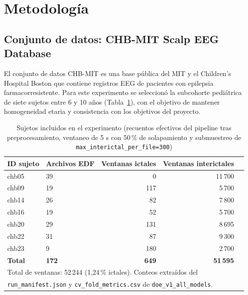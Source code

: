 \documentclass[12pt,a4paper]{article}
\begin{document}
\section{Metodología}

\subsection{Conjunto de datos: CHB-MIT Scalp EEG Database}

El conjunto de datos CHB-MIT \cite{chbmit} es una base pública del MIT y el Children's
Hospital Boston que contiene registros EEG de pacientes con epilepsia farmacorresistente.
Para este experimento se seleccionó la subcohorte pediátrica de siete sujetos entre 6 y 10
años (Tabla~\ref{tab:sujetos}), con el objetivo de mantener homogeneidad etaria y
consistencia con los objetivos del proyecto.

\begin{table}[H]
\centering
\caption{Sujetos incluidos en el experimento (recuentos efectivos del pipeline tras
preprocesamiento, ventaneo de 5 s con 50\,\% de solapamiento y submuestreo de
\texttt{max\_interictal\_per\_file=300})}
\label{tab:sujetos}
\renewcommand{\arraystretch}{1.2}
\begin{tabular}{llrrr}
\toprule
\textbf{ID sujeto} & \textbf{Archivos EDF} & \textbf{Ventanas ictales} &
\textbf{Ventanas interictales} \\
\midrule
chb05 & 39 & 0    & 11\,700 \\
chb09 & 19 & 117  & 5\,700 \\
chb14 & 26 & 82   & 7\,800 \\
chb16 & 19 & 52   & 5\,700 \\
chb20 & 29 & 131  & 8\,695 \\
chb22 & 31 & 87   & 9\,300 \\
chb23 & 9  & 180  & 2\,700 \\
\midrule
\textbf{Total} & \textbf{172} & \textbf{649} & \textbf{51\,595} \\
\bottomrule
\multicolumn{4}{l}{\small Total de ventanas: 52\,244 (1,24\,\% ictales). Conteos extraídos del} \\
\multicolumn{4}{l}{\small \texttt{run\_manifest.json} y \texttt{cv\_fold\_metrics.csv} de \texttt{doe\_v1\_all\_models}.}
\end{tabular}
\end{table}
\end{document}
